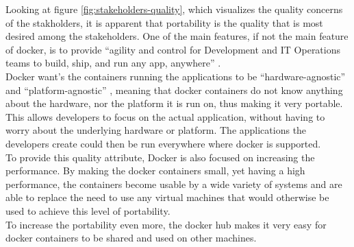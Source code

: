 Looking at figure \ref{fig:stakeholders-quality}, which visualizes the quality concerns of the stakholders, it is apparent that portability is the quality that is most desired among the stakeholders. One of the main features, if not the main feature of docker, is to provide ``agility and control for Development and IT Operations teams to build, ship, and run any app, anywhere'' \cite{dockermain}.\\
Docker want's the containers running the applications to be ``hardware-agnostic'' and ``platform-agnostic'' \cite{dockerrepo}, meaning that docker containers do not know anything about the hardware, nor the platform it is run on, thus making it very portable. This allows developers to focus on the actual application, without having to worry about the underlying hardware or platform. The applications the developers create could then be run everywhere where docker is supported.\\
To provide this quality attribute, Docker is also focused on increasing the performance. By making the docker containers small, yet having a high performance, the containers become usable by a wide variety of systems and are able to replace the need to use any virtual machines that would otherwise be used to achieve this level of portability. \cite{dockerrepo}\\
To increase the portability even more, the docker hub makes it very easy for docker containers to be shared and used on other machines.

